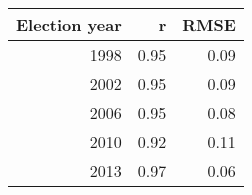 
\begin{tabular}{r|r|r}
\hline
Election year & r & RMSE\\
\hline
1998 & 0.95 & 0.09\\
\hline
2002 & 0.95 & 0.09\\
\hline
2006 & 0.95 & 0.08\\
\hline
2010 & 0.92 & 0.11\\
\hline
2013 & 0.97 & 0.06\\
\hline
\end{tabular}
